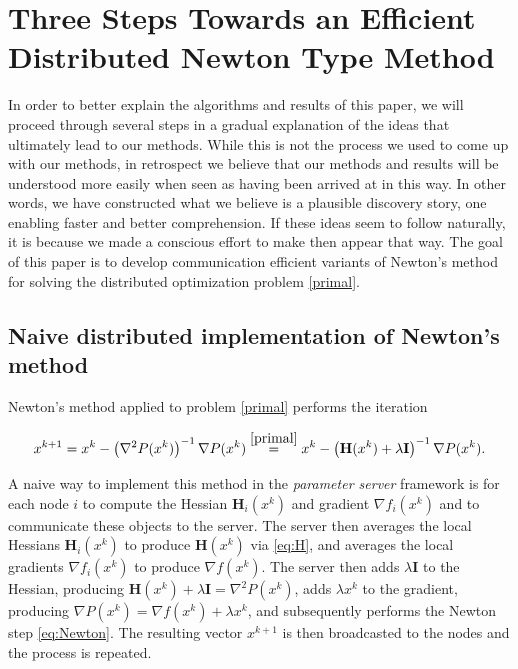\documentclass[10pt]{article}
\newcommand{\mH}{\mathbf{H}}
\newcommand{\mI}{\mathbf{I}}
\begin{document}
\section{Three Steps Towards an Efficient Distributed Newton Type Method} \label{sec:3steps}

In order to better explain the  algorithms and results of this paper, we will proceed through several steps in a gradual explanation of the ideas that ultimately lead to our methods. While this is not the process we used to come up with our methods, in retrospect we believe that our methods and results will be understood more easily when seen as having been arrived at in this way. In other words, we have constructed what we believe is a plausible discovery story, one enabling faster and better comprehension. If these ideas seem to follow naturally, it is because we made a conscious effort to make then appear that way. The goal of this paper is to develop communication efficient variants of Newton's method for solving the distributed optimization problem \eqref{primal}.   

\subsection{Naive distributed implementation of Newton's method} \label{subsec:Newton}


 Newton's method applied to problem \eqref{primal}  performs the iteration
 
 \begin{equation} \label{eq:Newton} x^{k+1} = x^k - \left(\nabla^2 P(x^k)\right)^{-1} \nabla P(x^k) \overset{\eqref{primal}}{=} x^k - \left(\mH(x^k) +\lambda \mI \right)^{-1} \nabla P(x^k).\end{equation}
 
A naive way to implement this method in the {\em parameter server} framework is for each node $i$ to compute the Hessian $\mH_i(x^k)$ and gradient $\nabla f_i(x^k)$ and to communicate these objects to the server. The server then averages the local Hessians $\mH_i(x^k)$ to produce $\mH(x^k)$ via \eqref{eq:H}, and averages the local gradients $\nabla f_i(x^k)$ to produce $\nabla f(x^k)$. The server then adds $\lambda \mI$ to the Hessian, producing $\mH(x^k) + \lambda \mI = \nabla^2 P(x^k)$, adds  $\lambda x^k$ to the gradient, producing $\nabla P(x^k) = \nabla f(x^k) + \lambda x^k$, and subsequently performs the Newton step \eqref{eq:Newton}. The resulting vector $x^{k+1}$ is then broadcasted to the nodes and the process is repeated. 
\end{document}
